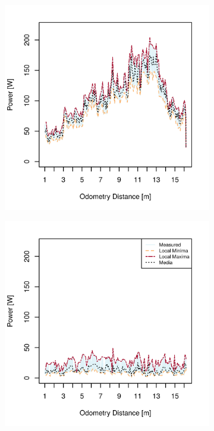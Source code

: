 \begin{figure}[h]
\begin{subfigure}[t]{\subfigureWidth}
        \includegraphics[height=\graphicsHeight]{sections/design/power-budget/plots/drive-power-draw-on-upslope-terrain.png}
		\label{fig:plot:sub:sherpatt-disaggregated-upslope-terrain-power-draw-drive}
	\end{subfigure}\hfill
    \begin{subfigure}[t]{\subfigureWidth}
        \centering
        \includegraphics[height=\graphicsHeight]{sections/design/power-budget/plots/suspension-power-draw-on-upslope-terrain.png}

\end{subfigure}
\end{figure}
